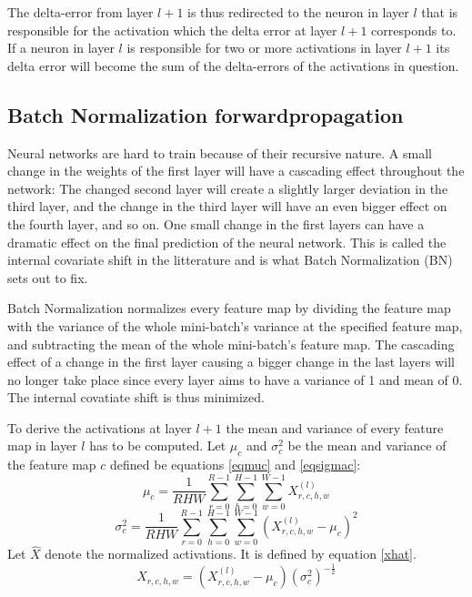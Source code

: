 \documentclass[a4paper, twoside]{article}
\begin{document}
The delta-error from layer $l+1$ is thus redirected to the neuron in layer $l$ that is responsible for the activation which the delta error at layer $l+1$ corresponds to. If a neuron in layer $l$ is responsible for two or more activations in layer $l+1$ its delta error will become the sum of the delta-errors of the activations in question. \cite{cs231n} \cite{convmath} \cite{webconv3}

\subsection{Batch Normalization forwardpropagation}
Neural networks are hard to train because of their recursive nature. A small change in the weights of the first layer will have a cascading effect throughout the network: The changed second layer will create a slightly larger deviation in the third layer, and the change in the third layer will have an even bigger effect on the fourth layer, and so on. One small change in the first layers can have a dramatic effect on the final prediction of the neural network. This is called  the internal covariate shift in the litterature and is what Batch Normalization (BN) sets out to fix. \cite{cs231n} \cite{batchnorm}

Batch Normalization normalizes every feature map by dividing the feature map with the variance of the whole mini-batch's variance at the specified feature map, and subtracting the mean of the whole mini-batch's feature map. The cascading effect of a change in the first layer causing a bigger change in the last layers will no longer take place since every layer aims to have a variance of 1 and mean of 0. The internal covatiate shift is thus minimized. \cite{cs231n} \cite{batchnorm}

To derive the activations at layer $l+1$ the mean and variance of every feature map in layer $l$ has to be computed. Let $\mu_c$ and $\sigma^2_c$ be the mean and variance of the feature map $c$ defined be equations \eqref{eqmuc} and \eqref{eqsigmac}: \cite{cs231n} \cite{batchnorm}
\begin{equation}\label{eqmuc}
\mu_c = \frac{1}{RHW} \sum^{R-1}_{r=0} \sum^{H-1}_{h=0} \sum^{W-1}_{w=0} X^{(l)}_{r,c,h,w}
\end{equation}
\begin{equation}\label{eqsigmac}
\sigma^2_c  = \frac{1}{RHW} \sum^{R-1}_{r=0} \sum^{H-1}_{h=0} \sum^{W-1}_{w=0} ({X^{(l)}_{r,c,h,w} - \mu_c})^2
\end{equation}
Let $\hat{X}$ denote the normalized activations. It is defined by equation \eqref{xhat}. \cite{cs231n} \cite{batchnorm}
\begin{equation}\label{xhat}
\hat{X}_{r,c,h,w} = (X^{(l)}_{r,c,h,w} - \mu_c){(\sigma^2_c)}^{-\frac{1}{2}}
\end{equation}
\end{document}
